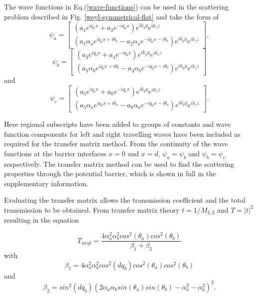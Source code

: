 \documentclass[prb,twocolumn,aps,superscriptaddress,showpacs,floatfix]{revtex4}
\begin{document}
	The wave functions in Eq.(\ref{wave-functions}) can be used in the scattering problem described in Fig. \ref{weyl-symmetrical-flat} and take the form of
	\begin{equation}
		\psi_{a}=
		\left[\begin{array}{ccc}
			\left(a_{1}e^{iq_{a}x}+a_{2}e^{-iq_{a}x}\right)e^{ik_{y}y}e^{ik_{z}z}\\
			\left(a_{1}\alpha_{a}e^{iq_{a}x+i\theta_{a}}-a_{2}\alpha_{a}e^{-iq_{a}x-i\theta_{a}}\right)e^{ik_{y}y}e^{ik_{z}z}
		\end{array}\right],
	\end{equation}
	\begin{equation}
		\psi_{b}=
		\left[\begin{array}{ccc}
			\left(a_{3}e^{iq_{b}x}+a_{4}e^{-iq_{b}x}\right)e^{ik_{y}y}e^{ik_{z}z}\\
			\left(a_{3}\alpha_{b}e^{iq_{b}x+i\theta_{b}}-a_{4}\alpha_{b}e^{-iq_{b}x-i\theta_{b}}\right)e^{ik_{y}y}e^{ik_{z}z}
		\end{array}\right]
	\end{equation}
	and
	\begin{equation}
		\psi_{c}=
		\left[\begin{array}{ccc}
			\left(a_{5}e^{iq_{a}x}+a_{6}e^{-iq_{a}x}\right)e^{ik_{y}y}e^{ik_{z}z}\\
			\left(a_{5}\alpha_{a}e^{iq_{a}x+i\theta_{a}}-a_{6}\alpha_{a}e^{-iq_{a}x-i\theta_{a}}\right)e^{ik_{y}y}e^{ik_{z}z}
		\end{array}\right].
	\end{equation}

	Here regional subscripts have been added to groups of constants and wave function components for left and right travelling waves have been included as required for the transfer matrix method. From the continuity of the wave functions at the barrier interfaces $x=0$ and $x=d$, $\psi_{a}=\psi_{b}$ and $\psi_{b}=\psi_{c}$ respectively. The transfer matrix method \cite{b18} can be used to find the scattering properties through the potential barrier, which is shown in full in the supplementary information.
	
	Evaluating the transfer matrix allows the transmission coefficient and the total transmission to be obtained. From transfer matrix theory $t=1/M_{2,2}$ and $T=|t|^{2}$ resulting in the equation

\begin{equation}
	T_{weyl}=\frac{4\alpha_{a}^{2}\alpha_{b}^{2}cos^{2}\left(\theta_{a}\right)cos^{2}\left(\theta_{b}\right)}{\beta_{1}+\beta_{2}}
	\label{barrier-t}
\end{equation}
with 
\begin{equation}
 \beta_{1} = 4\alpha_{a}^{2}\alpha_{b}^{2}cos^{2}\left(dq_{b}\right)cos^{2}\left(\theta_{a}\right)cos^{2}\left(\theta_{b}\right)
\end{equation}
and 
\begin{equation}
\beta_{2} = sin^{2}\left(dq_{b}\right)\left(2\alpha_{a}\alpha_{b}sin\left(\theta_{a}\right)sin\left(\theta_{b}\right)-\alpha_{a}^{2}-\alpha_{b}^{2}\right)^{2}.
\end{equation}
\end{document}
